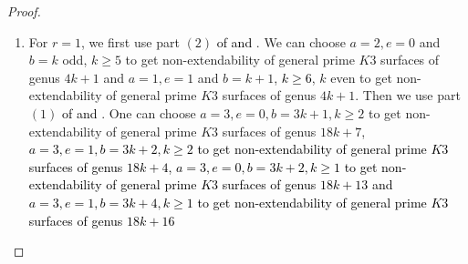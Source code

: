 \documentclass[11pt,twoside]{amsart}
\theoremstyle{plain}
\numberwithin{equation}{section}
\theoremstyle{definition}
\begin{document}
\begin{proof}
\begin{enumerate}
        \item[(5)] For $r = 1$, we first use part $(2)$ \textcolor{black}{of  and }. We can choose $a = 2, e = 0$  and $b = k$ odd, $k \geq 5$ to get non-extendability of general prime $K3$ surfaces of genus $4k+1$ and $a = 1, e = 1$  and $b = k+1$, \textcolor{black}{$k \geq 6$}, $k$ even to get non-extendability of general prime $K3$ surfaces of genus $4k+1$. Then we use part $(1)$ \textcolor{black}{of  and }. One can choose $a = 3, e = 0, b = 3k+1, k \geq 2$ to get non-extendability of general prime $K3$ surfaces of genus $18k+7$, \textcolor{black}{$a = 3, e = 1, b = 3k+2, k \geq 2$ to get non-extendability of general prime $K3$ surfaces of genus $18k+4$, $a = 3, e = 0, b = 3k+2, k \geq 1$ to get non-extendability of general prime $K3$ surfaces of genus $18k+13$ and $a = 3, e = 1, b = 3k+4, k \geq 1$ to get non-extendability of general prime $K3$ surfaces of genus $18k+16$ } 
       
       
       
        

        
     
    \end{enumerate}
\end{proof}
\end{document}
